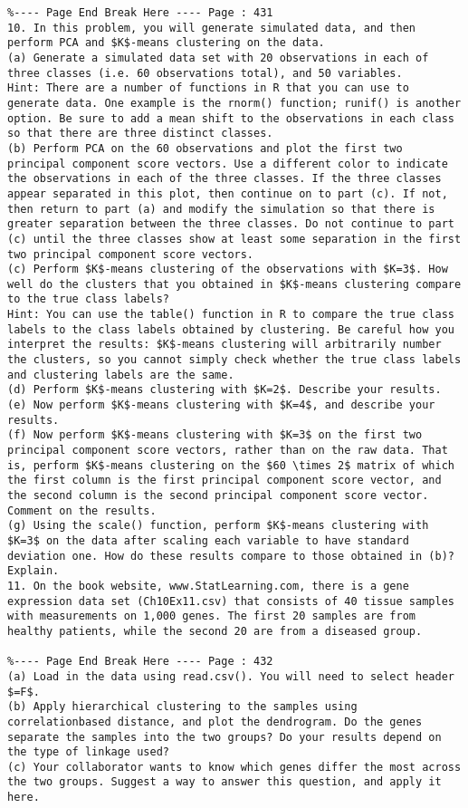 \documentclass[10pt]{article}
\begin{document}
\begin{verbatim}
%---- Page End Break Here ---- Page : 431
10. In this problem, you will generate simulated data, and then perform PCA and $K$-means clustering on the data.
(a) Generate a simulated data set with 20 observations in each of three classes (i.e. 60 observations total), and 50 variables.
Hint: There are a number of functions in R that you can use to generate data. One example is the rnorm() function; runif() is another option. Be sure to add a mean shift to the observations in each class so that there are three distinct classes.
(b) Perform PCA on the 60 observations and plot the first two principal component score vectors. Use a different color to indicate the observations in each of the three classes. If the three classes appear separated in this plot, then continue on to part (c). If not, then return to part (a) and modify the simulation so that there is greater separation between the three classes. Do not continue to part (c) until the three classes show at least some separation in the first two principal component score vectors.
(c) Perform $K$-means clustering of the observations with $K=3$. How well do the clusters that you obtained in $K$-means clustering compare to the true class labels?
Hint: You can use the table() function in R to compare the true class labels to the class labels obtained by clustering. Be careful how you interpret the results: $K$-means clustering will arbitrarily number the clusters, so you cannot simply check whether the true class labels and clustering labels are the same.
(d) Perform $K$-means clustering with $K=2$. Describe your results.
(e) Now perform $K$-means clustering with $K=4$, and describe your results.
(f) Now perform $K$-means clustering with $K=3$ on the first two principal component score vectors, rather than on the raw data. That is, perform $K$-means clustering on the $60 \times 2$ matrix of which the first column is the first principal component score vector, and the second column is the second principal component score vector. Comment on the results.
(g) Using the scale() function, perform $K$-means clustering with $K=3$ on the data after scaling each variable to have standard deviation one. How do these results compare to those obtained in (b)? Explain.
11. On the book website, www.StatLearning.com, there is a gene expression data set (Ch10Ex11.csv) that consists of 40 tissue samples with measurements on 1,000 genes. The first 20 samples are from healthy patients, while the second 20 are from a diseased group.

%---- Page End Break Here ---- Page : 432
(a) Load in the data using read.csv(). You will need to select header $=F$.
(b) Apply hierarchical clustering to the samples using correlationbased distance, and plot the dendrogram. Do the genes separate the samples into the two groups? Do your results depend on the type of linkage used?
(c) Your collaborator wants to know which genes differ the most across the two groups. Suggest a way to answer this question, and apply it here.


\end{verbatim}
\end{document}
